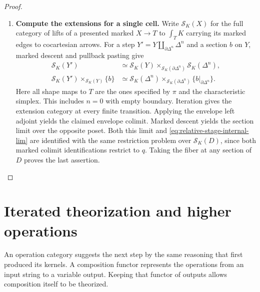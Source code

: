 \documentclass[oneside]{article}
\theoremstyle{plain}
\theoremstyle{definition}
\theoremstyle{remark}
\begin{document}
\begin{proof}
\begin{enumerate}
For the colimit, regard $M_A$ as a degreewise discrete simplicial
space. Its filtered colimit is $M$ degreewise: for any simplex of
$M$, the poset of stages containing it is nonempty and filtered.
The complete-Segal reflector preserves this colimit and gives the
category presented by each simplicial set
\cite[Thm.~4.11]{JoyalTierney2007}. Every final marked generator
already belongs to $S_0$ or occurs in a finite stage of $Q$.
Thus the marked colimit is the realization of $M$, identified
by $\pi$ with $(T,\tau)$ under the prescribed source.

\item \textbf{Compute the extensions for a single cell.}
Write $\mathcal S_K(X)$ for the full category of lifts of a presented
marked $X\to T$ to $\int_TK$ carrying its marked edges to cocartesian
arrows. For a step $Y'=Y\amalg_{\partial\Delta^n}\Delta^n$ and a
section $b$ on $Y$, marked descent and pullback pasting give
\[
 \begin{aligned}
 \mathcal S_K(Y')&\simeq
 \mathcal S_K(Y)\times_{\mathcal S_K(\partial\Delta^n)}
                         \mathcal S_K(\Delta^n),\\
 \mathcal S_K(Y')\times_{\mathcal S_K(Y)}\{b\}
 &\simeq\mathcal S_K(\Delta^n)
       \times_{\mathcal S_K(\partial\Delta^n)}\{b|_{\partial\Delta^n}\}.
 \end{aligned}
\]
Here all shape maps to $T$ are the ones specified by $\pi$ and the
characteristic simplex. This includes $n=0$ with empty boundary.
Iteration gives the extension category at every finite transition.
Applying the envelope left adjoint yields the claimed envelope
colimit. Marked descent yields the section limit over the opposite
poset. Both this limit and \eqref{eq:relative-stage-internal-lim}
are identified with the same restriction problem over
$\mathcal S_K(D)$, since both marked colimit identifications
restrict to $q$. Taking the fiber at any section of $D$ proves
the last assertion.\qedhere
\end{enumerate}
\end{proof}

\section{Iterated theorization and higher operations}
\label{sec:higher-composition}

An operation category suggests the next step by the same reasoning
that first produced its kernels. A composition functor represents the
operations from an input string to a variable output. Keeping that
functor of outputs allows composition itself to be theorized.
\end{document}
